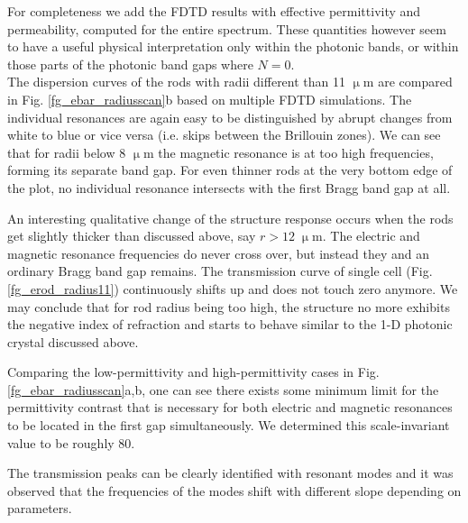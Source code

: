 {For completeness we add the FDTD results with effective permittivity and permeability, computed for the entire spectrum. These quantities however seem to have a useful physical interpretation only within the photonic bands, or within those parts of the photonic band gaps where $N = 0$. 
\\

The dispersion curves of the rods with radii different than 11 $\upmu$m are compared in Fig. \ref{fg_ebar_radiusscan}b based on multiple FDTD simulations. The individual resonances are again easy to be distinguished by abrupt changes from white to blue or vice versa (i.e. skips between the Brillouin zones). We can see that for radii below 8 $\upmu$m the magnetic resonance is at too high frequencies, forming its separate band gap. For even thinner rods at the very bottom edge of the plot, no individual resonance intersects with the first Bragg  band gap at all. 

An interesting qualitative change of the structure response occurs when the rods get slightly thicker than discussed above, say $r > 12\;\upmu$m. The electric and magnetic resonance frequencies do never cross over, but instead they  and an ordinary Bragg band gap remains. The transmission curve of single cell (Fig. \ref{fg_erod_radius11}) continuously shifts up and does not touch zero anymore. We may conclude that for rod radius being too high, the structure no more exhibits the negative index of refraction and starts to behave similar to the 1-D photonic crystal discussed above.


Comparing the low-permittivity and high-permittivity cases in Fig. \ref{fg_ebar_radiusscan}a,b, one can see there exists some minimum limit for the permittivity contrast that is necessary for both electric and magnetic resonances to be located in the first gap simultaneously. We determined this scale-invariant value to be roughly 80.

The transmission peaks can be clearly identified with resonant modes and it was observed that the frequencies of the modes shift with different slope depending on parameters.  
} 




